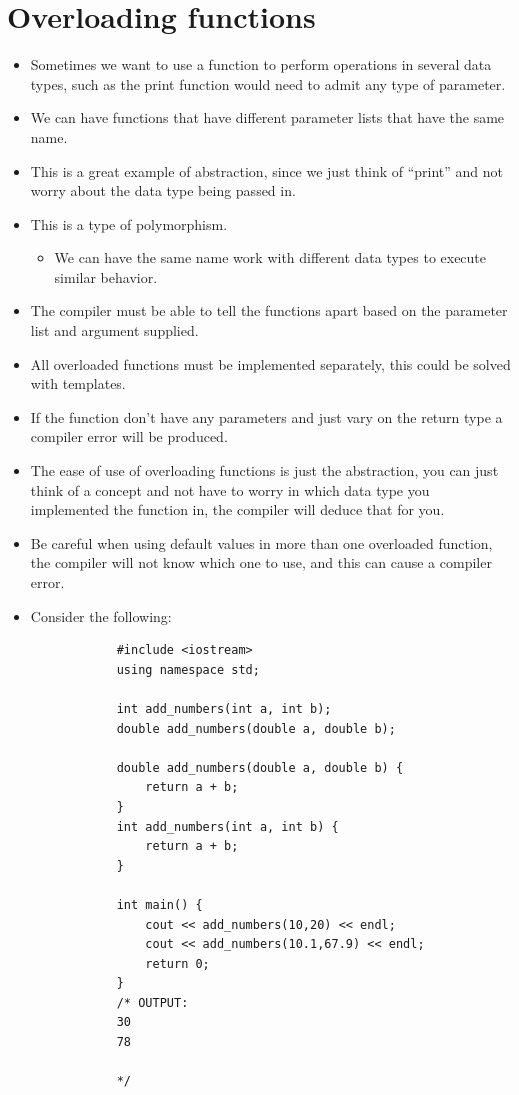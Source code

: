 \section{Overloading functions}
\begin{itemize}
    \item Sometimes we want to use a function to perform operations in several data types, such as the print function would need to admit any type of parameter.
    \item We can have functions that have different parameter lists that have the same name.
    \item This is a great example of abstraction, since we just think of ``print'' and not worry about the data type being passed in.  
    \item This is a type of polymorphism.
        \begin{itemize}
            \item We can have the same name work with different data types to execute similar behavior.
        \end{itemize}
    
    \item The compiler must be able to tell the functions apart based on the parameter list and argument supplied.
    \item All overloaded functions must be implemented separately, this could be solved with templates.
    \item If the function don't have any parameters and just vary on the return type a compiler error will be produced.
    \item The ease of use of overloading functions is just the abstraction, you can just think of a concept and not have to worry in which data type you implemented the function in, the compiler will deduce that for you.
    \item Be careful when using default values in more than one overloaded function, the compiler will not know which one to use, and this can cause a compiler error.
    \item Consider the following:
        \begin{verbatim}
            #include <iostream>
            using namespace std;

            int add_numbers(int a, int b);
            double add_numbers(double a, double b);

            double add_numbers(double a, double b) {
                return a + b;
            }
            int add_numbers(int a, int b) {
                return a + b;
            }

            int main() {
                cout << add_numbers(10,20) << endl;
                cout << add_numbers(10.1,67.9) << endl;
                return 0;
            }
            /* OUTPUT:
            30
            78

            */
        \end{verbatim}
\end{itemize}

